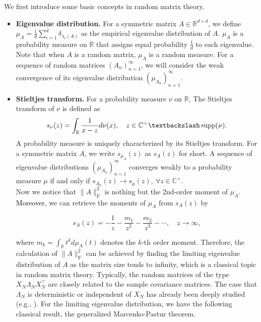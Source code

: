 \documentclass{article}
\newcommand{\R}{\mathbb{R}}
\newcommand{\mb}{\mathbb}
\newcommand{\rw}{\rightarrow}
\newcommand{\1}{^{(1)}}
\newcommand{\2}{^{(2)}}
\newcommand{\zhaoruirevise}[1]{\textcolor{black}{ #1}}
\begin{document}
We first introduce some basic concepts in random matrix theory.
\begin{itemize}
[topsep=1pt,parsep=1pt,partopsep=1pt, leftmargin=*]
    \item {\bf Eigenvalue distribution.} 
    For a symmetric matrix $A \in \mathbb{R}^{d\times d}$, we define  $\mu_A=\frac{1}{d}\sum_{i=1}^d \delta_{\lambda_i(A)}$ as the empirical eigenvalue distribution of $A$. $\mu_A$ is a probability measure on $\R$ that assigns equal probability $\frac{1}{d}$ to each eigenvalue. Note that when $A$ is a random matrix, $\mu_A$ is a random measure. For a sequence of random matrices $(A_n)_{n=1}^\infty$, we will consider the weak convergence of its eigenvalue distribution $(\mu_{A_n})_{n=1}^{\infty}$.
    \item {\bf Stieltjes transform.} For a probability measure $\nu$ on $\R$,
    The Stieltjes transform of $\nu$ is defined as 
    $$s_\nu(z)=\int_\mathbb{R} \frac{1}{x-z}d\nu(x),\quad z\in \mathbb{C}^+  \textbackslash \operatorname{supp}(\nu).$$
    A probability measure is uniquely characterized by its Stieltjes transform. For a symmetric matrix $A$, we write $s_{\mu_A}(z)$ as $s_{A}(z)$ for short. A sequence of eigenvalue distributions $(\mu_{A_n})_{n=1}^\infty$ converges weakly to a probability measure $\mu$ if and only if 
    $
    s_{A_n}(z)\rw s_{\mu}(z),\ \forall z\in \mb{C}^+.
    $
    \\
    
    Now we notice that $\|A\|_{\operatorname{F}}^2$ is nothing but the 2nd-order moment of $\mu_A$. \zhaoruirevise{Moreover}, we can retrieve the moments of $\mu_A$ from
    $s_A(z)$ by
    
\begin{equation}
\label{eq_stieltjes_power_series}
    s_{A}(z)= -\frac{1}{z} -\frac{m_1}{z^2} -\frac{m_2}{z^3} - \cdots,\quad z\rw\infty,
\end{equation}

    where $m_k = \int_{\mathbb{R}} t^k d\mu_A(t)$ denotes the $k$-th order moment. Therefore, the calculation of $\|A\|_\text{F}^2$ can be achieved by finding the limiting eigenvalue distribution of $A$ as the matrix size tends to infinity, which is a classical topic in random matrix theory. Typically, the random matrices of the type $X_N \Lambda_N X_N^\top$ are closely related to the sample covariance matrices. The case that $\Lambda_N$ is deterministic or independent of $X_N$ has already been deeply studied (e.g., \citet{YaoBook,Baibook,BaiZhou,Pastur67}). For the limiting eigenvalue distribution, we have the following classical result, the generalized Marcenko-Pastur theorem.

\end{itemize}
\end{document}
